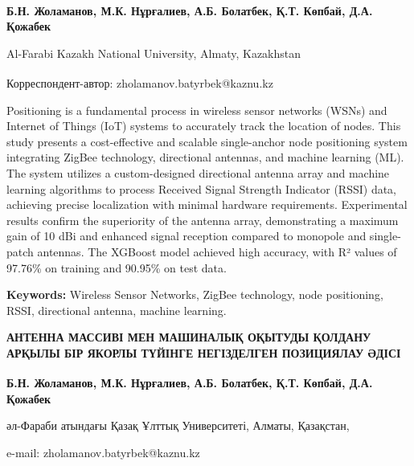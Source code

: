 
\begin{articleheader}

{\bfseries
Б.Н. Жоламанов\textsuperscript{\envelope },
М.К. Нұрғалиев,
А.Б. Болатбек,
Қ.Т. Көпбай,
Д.А. Қожабек
}
\end{articleheader}

\begin{affiliation}
Al-Farabi Kazakh National University, Almaty, Kazakhstan

\raggedright \textsuperscript{\envelope }Корреспондент-автор: zholamanov.batyrbek@kaznu.kz
\end{affiliation}

Positioning is a fundamental process in wireless sensor networks (WSNs)
and Internet of Things (IoT) systems to accurately track the location of
nodes. This study presents a cost-effective and scalable single-anchor
node positioning system integrating ZigBee technology, directional
antennas, and machine learning (ML). The system utilizes a
custom-designed directional antenna array and machine learning
algorithms to process Received Signal Strength Indicator (RSSI) data,
achieving precise localization with minimal hardware requirements.
Experimental results confirm the superiority of the antenna array,
demonstrating a maximum gain of 10 dBi and enhanced signal reception
compared to monopole and single-patch antennas. The XGBoost model
achieved high accuracy, with R² values of 97.76\% on training and
90.95\% on test data.

{\bfseries Keywords:} Wireless Sensor Networks, ZigBee technology, node
positioning, RSSI, directional antenna, machine learning.

\begin{articleheader}
{\bfseries АНТЕННА МАССИВІ МЕН МАШИНАЛЫҚ ОҚЫТУДЫ ҚОЛДАНУ АРҚЫЛЫ БІР ЯКОРЛЫ
ТҮЙІНГЕ НЕГІЗДЕЛГЕН ПОЗИЦИЯЛАУ ӘДІСІ}

{\bfseries
Б.Н. Жоламанов\textsuperscript{\envelope },
М.К. Нұрғалиев,
А.Б. Болатбек,
Қ.Т. Көпбай,
Д.А. Қожабек
}
\end{articleheader}

\begin{affiliation}
әл-Фараби атындағы Қазақ Ұлттық Университеті, Алматы, Қазақстан,

e-mail: zholamanov.batyrbek@kaznu.kz
\end{affiliation}


